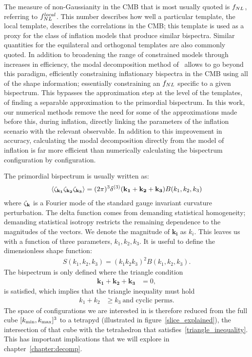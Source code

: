The measure of non-Gaussianity in the CMB that is
most usually quoted is $f_{NL}$, referring to $f^{local}_{NL}$.
This number describes how well a particular template, the local template,
describes the correlations in the CMB;
this template is used as a proxy for the class of inflation models that produce similar bispectra.
Similar quantities for the equilateral and orthogonal templates are also
commonly quoted.
In addition to broadening the range of constrained models through increases in efficiency,
the modal decomposition method of~\cite{FergShell_1,FergShell_2,FergShell_3}
allows to go beyond this paradigm, efficiently constraining inflationary bispectra in the CMB using
all of the shape information; essentially constraining an $f_{NL}$
specific to a given bispectrum. This bypasses the approximation step at the level of the templates,
of finding a separable approximation to the primordial bispectrum.
In this work, our numerical methods remove the need for some of the approximations
made before this, during inflation, directly linking the parameters of the inflation scenario
with the relevant observable.
In addition to this improvement in accuracy, calculating the modal decomposition
directly from the model of inflation is far more efficient 
than numerically calculating the bispectrum configuration by configuration.


The primordial bispectrum is usually written as:
\begin{align}
{
\left< \zeta_{\bf{k_1}}\zeta_{\bf{k_2}}\zeta_{\bf{k_3}} \right>
= (2\pi)^3\delta^{(3)}(\mathbf{k_1}+\mathbf{k_2}+\mathbf{k_3})B(k_1,k_2,k_3)
}
\end{align}
where $\zeta_{\bf{k}}$ is a Fourier mode of the standard gauge invariant curvature perturbation.
The delta function comes from demanding statistical homogeneity;
demanding statistical isotropy restricts the remaining dependence to the magnitudes of the vectors.
We denote the magnitude of $\mathbf{k_i}$ as $k_i$.
This leaves us with a function of three parameters,
$k_1,k_2,k_3$.
It is useful to define the dimensionless shape function:
\begin{align}\label{shapefn}
{
    S(k_1,k_2,k_3) = (k_1k_2k_3)^2B(k_1,k_2,k_3).
}
\end{align}
The bispectrum is only defined where the triangle condition
\begin{align}\label{triangle_condition}
    \mathbf{k_1}+\mathbf{k_2}+\mathbf{k_3} &= 0,
\end{align}
is satisfied, which implies that the triangle inequality must hold
\begin{align}\label{triangle_inequality}
    k_1+k_2 &\geq k_3~\text{and cyclic perms}.
\end{align}
The space of configurations we are interested in is therefore
reduced from the full cube $[{k_\text{min}},{k_\text{max}}]^3$
to a tetrapyd (illustrated in figure~\ref{slice_explained}),
the intersection of that cube with the
tetrahedron that satisfies~\eqref{triangle_inequality}.
This has important implications that we will explore in
chapter~\ref{chapter:decomp}. 



